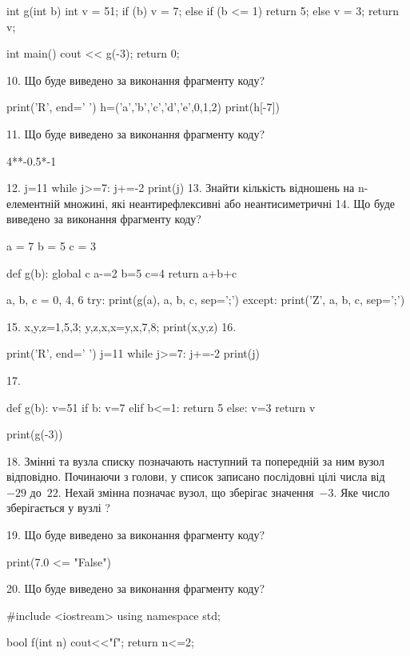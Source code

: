 \documentclass[11pt]{article}
\begin{document}
int g(int b){
    int v = 51;
    if (b) 
        v = 7;
    else if (b <= 1)
         return 5;
    else
         v = 3;
    return v;
}

int main(){
    cout << g(-3);
    return 0;
}


10. Що буде виведено за виконання фрагменту коду?

print('R', end=' ')
h=('a','b','c','d','e',0,1,2)
print(h[-7])


11. Що буде виведено за виконання фрагменту коду?

4**-0.5*-1

12. 
j=11
   while j>=7: j+=-2
   print(j)
13. 
Знайти кількість відношень на n-елементній множині, які неантирефлексивні або неантисиметричні
14. Що буде виведено за виконання фрагменту коду?

a = 7
b = 5
c = 3

def g(b):
global c    a-=2
    b=5
    c=4
    return a+b+c

a, b, c = 0, 4, 6
try:
    print(g(a), a, b, c, sep=';')
except:
    print('Z', a, b, c, sep=';')

15. 
x,y,z=1,5,3;  y,z,x,x=y,x,7,8;  print(x,y,z)
16. 

print('R', end=' ')
j=11
while j>=7:
    j+=-2
print(j)


17. 

def g(b):
    v=51
    if b: 
        v=7
    elif b<=1:
         return 5
    else:
         v=3
    return v

print(g(-3))

18. 
Змінні  та  вузла списку позначають наступний та попередній за ним вузол відповідно. Починаючи з голови, у список записано послідовні цілі числа від~$-29$ до~$22$. Нехай змінна  позначає вузол, що зберігає значення~$-3$.
Яке число зберігається у вузлі  ?

19. Що буде виведено за виконання фрагменту коду?

print(7.0 <= "False")

20. Що буде виведено за виконання фрагменту коду?

#include <iostream>
using namespace std;

bool f(int n){
    cout<<"f";
    return n<=2;
}
\end{document}
